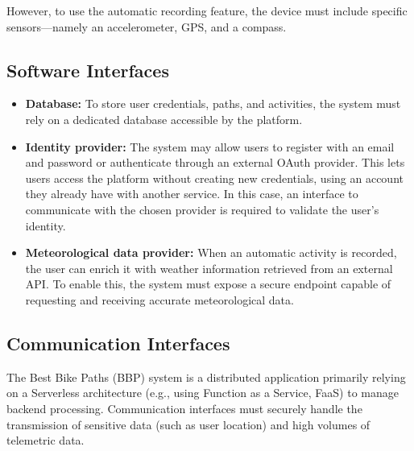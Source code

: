 However, to use the automatic recording feature, the device must include specific sensors—namely an accelerometer, GPS, and a compass.


\subsection{Software Interfaces}
\label{subsec:software_interfaces}

\begin{itemize}
    \item \textbf{Database:} To store user credentials, paths, and activities, the system must rely on a dedicated database accessible by the platform.
    
    \item \textbf{Identity provider:} The system may allow users to register with an email and password or authenticate through an external OAuth provider. This lets users access the platform without creating new credentials, using an account they already have with another service. In this case, an interface to communicate with the chosen provider is required to validate the user’s identity.
    
    \item \textbf{Meteorological data provider:} When an automatic activity is recorded, the user can enrich it with weather information retrieved from an external API. To enable this, the system must expose a secure endpoint capable of requesting and receiving accurate meteorological data.
\end{itemize}

\subsection{Communication Interfaces}
\label{subsec:communication_interfaces}

The Best Bike Paths (BBP) system is a distributed application primarily relying on a Serverless architecture (e.g., using Function as a Service, FaaS) to manage backend processing. Communication interfaces must securely handle the transmission of sensitive data (such as user location) and high volumes of telemetric data.

